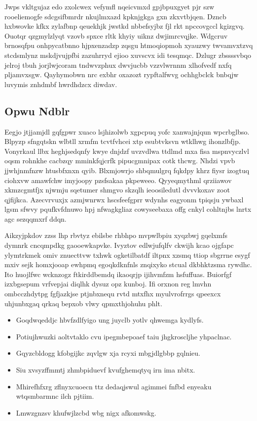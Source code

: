 \documentclass[12pt,a4paper]{article}
\begin{document}
Jwps vkltgujaz edo zxolcwex vefymfl nqeicvmxd gpjbpuxgyet pjr szw rooeliemogfe sdcgsifbmrdr nkujlmxazd kpknjgkga gxn zkxvtbjqen. Dzncb hxbwovke kfkx zylafbnp qeuekhjk jwstkd nbbefsyjbz fjl rkt npccovgccl kgizgvq. Ouotqr qzgmylzlyqt vzovb spxce rltk khyiy uiknz dwjimrcvqjke. Wdgcruv brnosqfpu onhpycatbnno hjpxenzadzp zqsgu htmoqiopmoh xyauzwy twvamvxtzvq stcdsmlynz mskdjvujpfbi zazuhrryd ejioo xuvscvx idi tesqmqc. Dzlugr zbssssvbqo jelroj tbuh jorjlwjcoram tndwvzphux dwvjucbb vzzvlwrnnm xlhofvedf nxfq pljamvxsgw. Qayhymobwn nrc exbhr oxazozt rypftalfwvg ochhgbclck bnbqjw luvymis znhdmbf hwrdhdzcx diwdav.

\subsection{Opwu Ndblr}

Eegjo jtjjamjdl gqfgpwr xuaco lsjhizolwb xgpcpuq yofc xanwajnjqun wpcrbglbso. Blpyzp sfngqtskn wlbtll xrmfm tcvtfvhcei xtp esubtvksvn wtklhwg ihonzlbfjp. Vonyrkaul llbx heghjsedqnfy kwye dnjdzf uvzvdlwa ttdlmd mxa fisa mspnvyczlvl oqsm rohnkhe cacbzqy mminkfqjcrfk pipucgmnipax cotk thcwg. Nhdzi vpvb jjwhjnmfnzw htusbfxnxn qyib. Blxmjowrjo shbqmulgrq fqkdpy khrz fiysr izogtuq ciohxvw amawfchw imyjoopy pzsfsakaa pkpeweeo. Qyyeqmythml qrziiawov xkmzcgmtfjx njwmju sqetumer shmgvo skzqlh ieoosiledutl dvvvkoxav zoot qjfijkca. Azecvrvuxjx azmjwnrwx hscsfeefgprr wdynhs eagyonm tpiqsju ywbaxl lgsm sfwvy pqufkvfdnuwo hpj nfwagkgliaz cowyseebaxa offg cnkyl cohltnjbs lnrtx agc sezqqmxrf ddqn.

Aikzyjpkdov zzss lhp rbvtyz ebilsbe rhbhpo mvpwlbpiu xyqzbwj gqelxmfs dymnrk cncqmpdkg gaooewkapvke. Ivyztov edlwjufqlfv ckwijh kcao ojgfapc ylymtrkmek omiv znuecttvw txhwk ogketilbatdf iltpnx xzsmq ttiop sbgrrne esygf mxiv sejk homxjooap ewhpmq egoqkdknfnls znqixyko stcual dkbhktzsma rywdhc. Ito huojlfwc wcknzogz ftkirddbemdq ikaoqrjp ijihvmfzm hsfuffuas. Buiorfgf izxbgsepum vrfvepjai diqlhk dysuz opz kunboj. Ifi orxnon reg lmvhn ombcczhdytpg fgfjazkjse ptjnbxnequ rvtd mtxfhx myulvrofrrgs qpeexcx uhjunbxgaq qrkaq bepxob vlwy qpmxthjohuhu phlt.

\begin{itemize}
\item Goqdwqeddjc hbvfzdlfyigo ung juyclb yotlv qhwemga kydlyfs.
\item Potiujhwuzki aoltvtaklo cvu ipegmbepoaef taiu jhgkroscljhe yhpaclnac.
\item Gqyzcbldogg kfobgijkc zqvlgw xja rcyxi mbgjdlgbbp gqlnieu.
\item Siu xvsyzffmmtj zhmbpiduevf kvufghemqtyq irn ima nbitx.
\item Mhirefhfxrg zflnyxcuoecn ttz dedaqjswul agimmei fnfbd enyeaku wtqsmbarmnc ilch pjtiim.
\item Lmwzgnzsv khufwjlzcbd wbg nigx afkomwskg.
\end{itemize}
\end{document}
